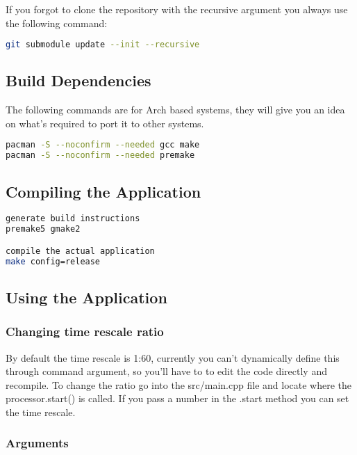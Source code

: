 \documentclass[12pt,a4paper]{article}
\begin{document}
If you forgot to clone the repository with the recursive argument you always use the following command:

\begin{lstlisting}[language=bash]
git submodule update --init --recursive
\end{lstlisting}

\subsection{Build Dependencies}

The following commands are for Arch based systems, they will give you an idea on what's required to port it to other systems.

\begin{lstlisting}[language=bash]
pacman -S --noconfirm --needed gcc make
pacman -S --noconfirm --needed premake
\end{lstlisting}

\subsection{Compiling the Application}

\begin{lstlisting}[language=bash]
generate build instructions
premake5 gmake2

compile the actual application
make config=release
\end{lstlisting}

\subsection{Using the Application}

\subsubsection{Changing time rescale ratio}

By default the time rescale is 1:60, currently you can't dynamically define this through command argument, so you'll have to to edit the code directly and recompile. To change the ratio go into the src/main.cpp file and locate where the processor.start() is called. If you pass a number in the .start method you can set the time rescale.

\subsubsection{Arguments}
\end{document}
